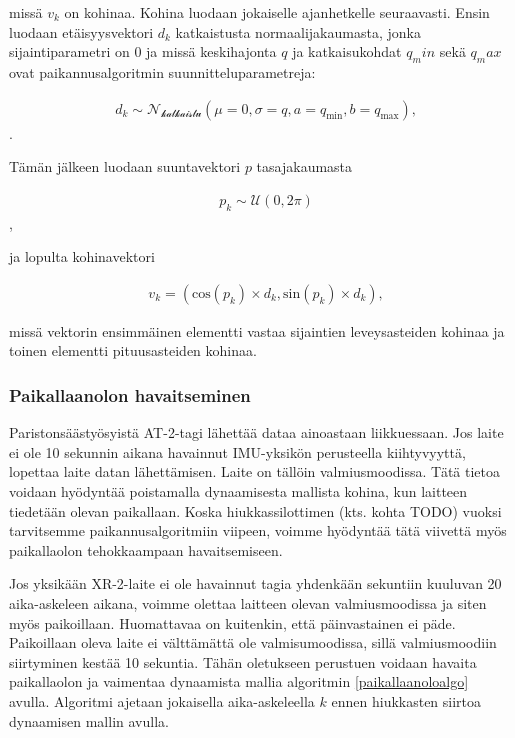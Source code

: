 \documentclass[
  12pt,
  a4paper, twoside]{book}
\begin{document}
missä \(v_k\) on kohinaa. Kohina luodaan jokaiselle ajanhetkelle seuraavasti. Ensin luodaan etäisyysvektori \(d_k\) katkaistusta normaalijakaumasta, jonka sijaintiparametri on 0 ja missä keskihajonta \(q\) ja katkaisukohdat \(q_min\) sekä \(q_max\) ovat paikannusalgoritmin suunnitteluparametreja:

\begin{align}
&d_k \sim \mathcal{N_{\text{katkaistu}}}(\mu=0, \sigma=q, a=q_{\text{min}}, b=q_{\text{max}}),
\end{align}.

Tämän jälkeen luodaan suuntavektori \(p\) tasajakaumasta

\begin{align}
&p_k\sim\mathcal{U}(0, 2 \pi)
\end{align},

ja lopulta kohinavektori

\begin{align}
&v_k = (\text{cos}(p_k) \times d_k, \text{sin}(p_k) \times d_k),
\end{align}

missä vektorin ensimmäinen elementti vastaa sijaintien leveysasteiden kohinaa ja toinen elementti pituusasteiden kohinaa.

\hypertarget{paikallaanolon-havaitseminen}{%
\subsubsection{Paikallaanolon havaitseminen}\label{paikallaanolon-havaitseminen}}

Paristonsäästyösyistä AT-2-tagi lähettää dataa ainoastaan liikkuessaan. Jos laite ei ole 10 sekunnin aikana havainnut IMU-yksikön perusteella kiihtyvyyttä, lopettaa laite datan lähettämisen. Laite on tällöin valmiusmoodissa. Tätä tietoa voidaan hyödyntää poistamalla dynaamisesta mallista kohina, kun laitteen tiedetään olevan paikallaan. Koska hiukkassilottimen (kts. kohta TODO) vuoksi tarvitsemme paikannusalgoritmiin viipeen, voimme hyödyntää tätä viivettä myös paikallaolon tehokkaampaan havaitsemiseen.

Jos yksikään XR-2-laite ei ole havainnut tagia yhdenkään sekuntiin kuuluvan 20 aika-askeleen aikana, voimme olettaa laitteen olevan valmiusmoodissa ja siten myös paikoillaan. Huomattavaa on kuitenkin, että päinvastainen ei päde. Paikoillaan oleva laite ei välttämättä ole valmisumoodissa, sillä valmiusmoodiin siirtyminen kestää 10 sekuntia. Tähän oletukseen perustuen voidaan havaita paikallaolon ja vaimentaa dynaamista mallia algoritmin \ref{paikallaanoloalgo} avulla. Algoritmi ajetaan jokaisella aika-askeleella \(k\) ennen hiukkasten siirtoa dynaamisen mallin avulla.
\end{document}
